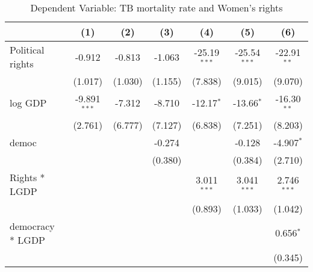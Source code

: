 \documentclass[10pt,letterpaper,subeqn]{beamer}
\begin{document}
\begin{frame}[label=placebo1]
%
\begin{table}[htbp]\centering
\scriptsize
\caption{Dependent Variable: TB mortality rate and Women's rights}
\begin{tabular}{l*{6}{c}}
\hline\hline
            &\multicolumn{1}{c}{(1)}&\multicolumn{1}{c}{(2)}&\multicolumn{1}{c}{(3)}&\multicolumn{1}{c}{(4)}&\multicolumn{1}{c}{(5)}&\multicolumn{1}{c}{(6)}\\
\hline
Political rights       &      -0.912         &      -0.813         &      -1.063         &      -25.19$^{***}$&      -25.54$^{***}$&      -22.91$^{**}$ \\
            &     (1.017)         &     (1.030)         &     (1.155)         &     (7.838)         &     (9.015)         &     (9.070)         \\

log GDP        &      -9.891$^{***}$&      -7.312         &      -8.710         &      -12.17$^{*}$  &      -13.66$^{*}$  &      -16.30$^{**}$ \\
            &     (2.761)         &     (6.777)         &     (7.127)         &     (6.838)         &     (7.251)         &     (8.203)         \\

democ       &                     &                     &      -0.274         &                     &      -0.128         &      -4.907$^{*}$  \\
            &                     &                     &     (0.380)         &                     &     (0.384)         &     (2.710)         \\

Rights * LGDP  &                     &                     &                     &       3.011$^{***}$&       3.041$^{***}$&       2.746$^{***}$\\
            &                     &                     &                     &     (0.893)         &     (1.033)         &     (1.042)         \\

democracy * LGDP   &                     &                     &                     &                     &                     &       0.656$^{*}$  \\
            &                     &                     &                     &                     &                     &     (0.345)         \\


\end{tabular}
\end{table}
\end{frame}
\end{document}
